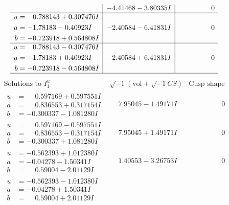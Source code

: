 \documentclass[1p]{elsarticle_modified}
\theoremstyle{definition}
\newcommand{\I}{\sqrt{-1}}
\begin{document}
$$\begin{array}{c|c|c}
 & -4.41468 - 3.80335 I & \phantom{-0.000000 } 0 \\ \hline\begin{aligned}
u &= \phantom{-}0.788143 + 0.307476 I \\
a &= -1.78183 - 0.40923 I \\
b &= -0.723918 + 0.564808 I\end{aligned}
 & -2.40584 - 6.41831 I & \phantom{-0.000000 } 0 \\ \hline\begin{aligned}
u &= \phantom{-}0.788143 - 0.307476 I \\
a &= -1.78183 + 0.40923 I \\
b &= -0.723918 - 0.564808 I\end{aligned}
 & -2.40584 + 6.41831 I & \phantom{-0.000000 } 0\\
 \hline 
 \end{array}$$\newpage$$\begin{array}{c|c|c}  
\text{Solutions to }I^u_{1}& \I (\text{vol} + \sqrt{-1}CS) & \text{Cusp shape}\\
 \hline 
\begin{aligned}
u &= \phantom{-}0.597169 + 0.597551 I \\
a &= \phantom{-}0.836553 + 0.317154 I \\
b &= -0.300337 - 1.081280 I\end{aligned}
 & \phantom{-}7.95045 - 1.49171 I & \phantom{-0.000000 } 0 \\ \hline\begin{aligned}
u &= \phantom{-}0.597169 - 0.597551 I \\
a &= \phantom{-}0.836553 - 0.317154 I \\
b &= -0.300337 + 1.081280 I\end{aligned}
 & \phantom{-}7.95045 + 1.49171 I & \phantom{-0.000000 } 0 \\ \hline\begin{aligned}
u &= -0.562393 + 1.012380 I \\
a &= -0.04278 - 1.50341 I \\
b &= \phantom{-}0.59004 - 2.01129 I\end{aligned}
 & \phantom{-}1.40553 - 3.26753 I & \phantom{-0.000000 } 0 \\ \hline\begin{aligned}
u &= -0.562393 - 1.012380 I \\
a &= -0.04278 + 1.50341 I \\
b &= \phantom{-}0.59004 + 2.01129 I\end{aligned}

\end{array}$$
\end{document}

